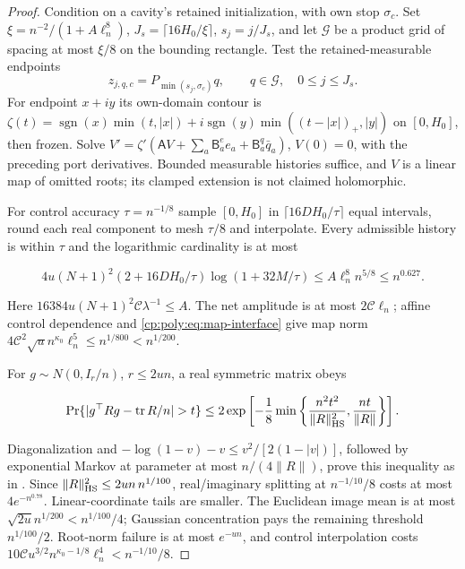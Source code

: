\begin{proof}
Condition on a cavity's retained initialization, with own stop $\sigma_c$.
Set $\xi=n^{-2}/(1+A\ell_n^8)$,
$J_s=\lceil16H_0/\xi\rceil$, $s_j=j/J_s$, and let $\mathscr G$
be a product grid of spacing at most $\xi/8$ on the bounding rectangle.
Test the retained-measurable endpoints
\begin{equation}
z_{j,q,c}=P_{\min(s_j,\sigma_c)}q,
\qquad q\in\mathscr G,\quad0\le j\le J_s.
\label{cp:poly:eq:prefix-grid}
\end{equation}
For endpoint $x+iy$ its own-domain contour is
$\zeta(t)=\operatorname{sgn}(x)\min(t,|x|)
+i\operatorname{sgn}(y)\min((t-|x|)_+,|y|)$ on $[0,H_0]$,
then frozen. Solve
$V'=\zeta'(\mathsf AV+\sum_a\mathsf B_a^ee_a+\mathsf B_a^q\bar q_a)$,
$V(0)=0$, with the preceding port derivatives. Bounded measurable
histories suffice, and $V$ is a linear map of omitted roots; its
clamped extension is not claimed holomorphic.

For control accuracy $\tau=n^{-1/8}$ sample $[0,H_0]$ in
$\lceil16DH_0/\tau\rceil$ equal intervals, round each real component
to mesh $\tau/8$ and interpolate. Every admissible history is within
$\tau$ and the logarithmic cardinality is at most

\[
4u(N+1)^2(2+16DH_0/\tau)\log(1+32M/\tau)
 \le A\ell_n^8n^{5/8}\le n^{0.627}.
\]

Here $16384u(N+1)^2\mathcal C\lambda^{-1}\le A$.
The net amplitude is at most $2\mathcal C\ell_n$; affine control
dependence and \eqref{cp:poly:eq:map-interface} give map norm
$4\mathcal C^2\sqrt u n^{\kappa_0}\ell_n^5
\le n^{1/800}<n^{1/200}$.

For $g\sim N(0,I_r/n)$, $r\le2un$, a real symmetric matrix obeys

\[
\Pr\{|g^\top Rg-\operatorname{tr}R/n|>t\}
 \le2\exp\left[-\frac18\min\left\{
 \frac{n^2t^2}{\|R\|_{\rm HS}^2},\frac{nt}{\|R\|}\right\}\right].
\]

Diagonalization and
$-\log(1-v)-v\le v^2/[2(1-|v|)]$, followed by exponential Markov
at parameter at most $n/(4\|R\|)$, prove this inequality as in
. Since
$\|R\|_{\rm HS}^2\le2un\,n^{1/100}$, real/imaginary splitting
at $n^{-1/10}/8$ costs at most $4e^{-n^{0.78}}$.
Linear-coordinate tails are smaller. The Euclidean image mean is
at most $\sqrt{2u}n^{1/200}<n^{1/100}/4$; Gaussian concentration
pays the remaining threshold $n^{1/100}/2$.
Root-norm failure is at most $e^{-un}$, and control interpolation
costs $10\mathcal C u^{3/2}n^{\kappa_0-1/8}\ell_n^4<n^{-1/10}/8$.


\end{proof}
